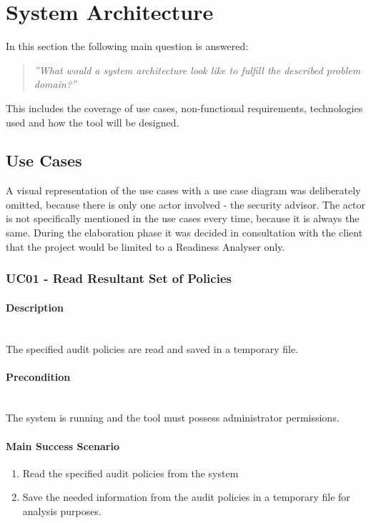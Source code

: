 \section{System Architecture}
In this section the following main question is answered: 
\begin{quotation}
    \textit{''What would a system architecture look like to fulfill the described problem domain?''}
\end{quotation}
This includes the coverage of use cases, non-functional requirements, technologies used and how the tool will be designed. 

\subsection{Use Cases}
A visual representation of the use cases with a use case diagram was deliberately omitted, because there is only one actor involved - the security advisor. The actor is not specifically mentioned in the use cases every time, because it is always the same. During the elaboration phase it was decided in consultation with the client that the project would be limited to a Readiness Analyser only.

\subsubsection{UC01 - Read Resultant Set of Policies}\label{UC01}
\begin{tcolorbox}
    \paragraph{Description} \ \\
    The specified audit policies are read and saved in a temporary file.
    \ \\
    \paragraph{Precondition} \ \\
    The system is running and the tool must possess administrator permissions.
    \ \\
    \paragraph{Main Success Scenario} 
    \begin{enumerate}
        \item Read the specified audit policies from the system
        \item Save the needed information from the audit policies in a temporary file for analysis purposes.
    \end{enumerate}   
\end{tcolorbox}

